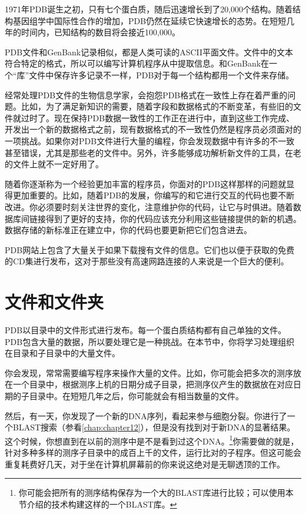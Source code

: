 1971年PDB诞生之初，只有七个蛋白质，随后迅速增长到了20,000个结构。随着结构基因组学中国际性合作的增加，PDB仍然在延续它快速增长的态势。在短短几年的时间内，已知结构的数目将会接近100,000。

PDB文件和GenBank记录相似，都是人类可读的ASCII平面文件。文件中的文本符合特定的格式，所以可以编写计算机程序从中提取信息。和GenBank在一个“库”文件中保存许多记录不一样，PDB对于每一个结构都用一个文件来存储。

经常处理PDB文件的生物信息学家，会抱怨PDB格式在一致性上存在着严重的问题。比如，为了满足新知识的需要，随着字段和数据格式的不断变革，有些旧的文件就过时了。现在保持PDB数据一致性的工作正在进行中，直到这些工作完成、开发出一个新的数据格式之前，现有数据格式的不一致性仍然是程序员必须面对的一项挑战。如果你对PDB文件进行大量的编程，你会发现数据中有许多的不一致甚至错误，尤其是那些老的文件中。另外，许多能够成功解析新文件的工具，在老的文件上就不一定好用了。

随着你逐渐称为一个经验更加丰富的程序员，你面对的PDB这样那样的问题就显得更加重要的。比如，随着PDB的发展，你编写的和它进行交互的代码也要不断改进。你必须要时刻关注世界的变化，注意维护你的代码，让它与时俱进。随着数据库间链接得到了更好的支持，你的代码应该充分利用这些链接提供的新的机遇。数据存储的新标准正在建立中，你的代码也要更新把它们包含进去。

PDB网站上包含了大量关于如果下载搜有文件的信息。它们也以便于获取的免费的CD集进行发布，这对于那些没有高速网路连接的人来说是一个巨大的便利。

\section{文件和文件夹}
PDB以目录中的文件形式进行发布。每一个蛋白质结构都有自己单独的文件。PDB包含大量的数据，所以要处理它是一种挑战。在本节中，你将学习处理组织在目录和子目录中的大量文件。

你会发现，常常需要编写程序来操作大量的文件。比如，你可能会把多次的测序放在一个目录中，根据测序上机的日期分成子目录，把测序仪产生的数据放在对应日期的子目录中。在短短几年之后，你可能就会有相当数量的文件。

然后，有一天，你发现了一个新的DNA序列，看起来参与细胞分裂。你进行了一个BLAST搜索（参看\autoref{chap:chapter12}），但是没有找到对于新DNA的显著结果。这个时候，你想直到在以前的测序中是不是看到过这个DNA。\footnote{你可能会把所有的测序结构保存为一个大的BLAST库进行比较；可以使用本节介绍的技术构建这样的一个BLAST库。}你需要做的就是，针对多种多样的测序子目录中的成百上千的文件，运行比对的子程序。但这可能会重复耗费好几天，对于坐在计算机屏幕前的你来说这绝对是无聊透顶的工作。

